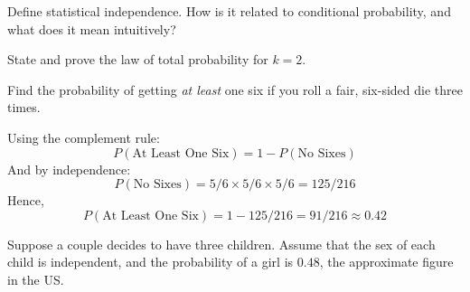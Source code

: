 \documentclass[addpoints,12pt]{exam}
\begin{document}
\begin{questions}
\question Define statistical independence. How is it related to conditional probability, and what does it mean intuitively?

\question State and prove the law of total probability for $k = 2$.

\question Find the probability of getting \emph{at least} one six if you roll a fair, six-sided die three times.
		\begin{solution}
			Using the complement rule:
				$$P(\mbox{At Least One Six}) = 1 - P(\mbox{No Sixes})$$
			And by independence:
				$$P(\mbox{No Sixes}) = 5/6 \times 5/6 \times 5/6 = 125/216$$
			Hence, 
			$$P(\mbox{At Least One Six}) = 1 - 125/216 = 91/216 \approx 0.42$$
		\end{solution}
	

\question Suppose a couple decides to have three children. Assume that the sex of each child is independent, and the probability of a girl is $0.48$, the approximate figure in the US. 
\end{questions}
\end{document}
